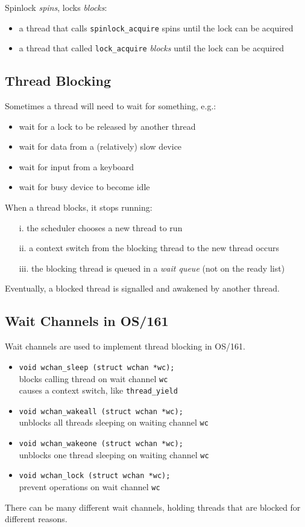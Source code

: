 \documentclass[12pt]{article}
\theoremstyle{plain}
\theoremstyle{definition}
\begin{document}
Spinlock \emph{spins}, locks \emph{blocks}:
\begin{itemize}
  \item a thread that calls \texttt{spinlock\_acquire} spins until the lock can be acquired
  \item a thread that called \texttt{lock\_acquire} \emph{blocks} until the lock can be acquired
\end{itemize}

\subsection{Thread Blocking}
Sometimes a thread will need to wait for something, e.g.:
\begin{itemize}
  \item wait for a lock to be released by another thread
  \item wait for data from a (relatively) slow device
  \item wait for input from a keyboard
  \item wait for busy device to become idle
\end{itemize}

When a thread blocks, it stops running:
\begin{enumerate}
  \item[i.] the scheduler chooses a new thread to run
  \item[ii.] a context switch from the blocking thread to the new thread occurs
  \item[iii.] the blocking thread is queued in a \emph{wait queue} (not on the ready list)
\end{enumerate}

Eventually, a blocked thread is signalled and awakened by another thread.

\subsection{Wait Channels in OS/161}
Wait channels are used to implement thread blocking in OS/161.
\begin{itemize}
  \item \texttt{void wchan\_sleep (struct wchan *wc);} \\
  blocks calling thread on wait channel \texttt{wc} \\
  causes a context switch, like \texttt{thread\_yield}
  \item \texttt{void wchan\_wakeall (struct wchan *wc);} \\
  unblocks all threads sleeping on waiting channel \texttt{wc}
  \item \texttt{void wchan\_wakeone (struct wchan *wc);} \\
  unblocks one thread sleeping on waiting channel \texttt{wc}
  \item \texttt{void wchan\_lock (struct wchan *wc);} \\
  prevent operations on wait channel \texttt{wc}
\end{itemize}
There can be many different wait channels, holding threads that are blocked for different reasons. \\
\end{document}
